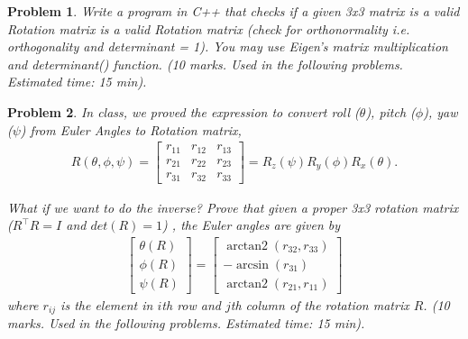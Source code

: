 \documentclass[twocolumn]{article}
\newtheorem{prob}{Problem}
\newif\ifsol
\DeclareMathOperator{\arctantwo}{arctan2}
\begin{document}
\begin{prob}
  Write a program in C++ that checks if a given
  3x3 matrix is a valid Rotation matrix is a valid Rotation matrix  (check for
  orthonormality i.e. orthogonality and determinant = 1). You may use Eigen's
  matrix multiplication and determinant() function. (10 marks. Used in the
  following problems. Estimated time: 15 min). 
\end{prob}

\ifsol
\paragraph*{Solution}
Please look at the function \verb|is_valid_rot| in file \verb|hw1.cpp|.
\fi

\begin{prob}
  In class, we proved the expression to convert roll ($\theta$), pitch
  ($\phi$), yaw ($\psi$) from Euler Angles to Rotation matrix,
  \begin{align}
    R(\theta, \phi, \psi) =
    \begin{bmatrix}
      r_{11}& r_{12} & r_{13} \\
      r_{21}& r_{22} & r_{23} \\
      r_{31}& r_{32} & r_{33}
    \end{bmatrix} 
                       = R_z(\psi) R_y(\phi) R_x(\theta).
  \end{align}
  
  What if we want to do the inverse? Prove that given a proper 3x3 rotation
  matrix  ($R^\top R = I$ and $det(R) = 1$) , the Euler angles are given by
  \begin{align}
    \begin{bmatrix}
    \theta(R) \\
    \phi(R) \\
    \psi(R)
    \end{bmatrix}
    = \begin{bmatrix}
      \arctantwo(r_{32}, r_{33}) \\
      -\arcsin(r_{31}) \\
      \arctantwo(r_{21}, r_{11})
      \end{bmatrix}
  \end{align}
  where $r_{ij}$ is the element in $i$th row and $j$th column of the rotation
  matrix $R$. (10 marks. Used in the
  following problems. Estimated time: 15 min).
\end{prob}

\ifsol
\end{document}
